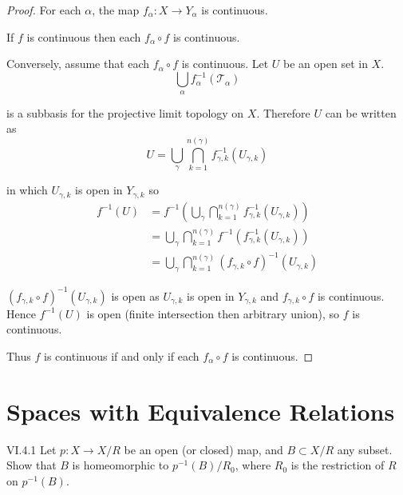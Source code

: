 \begin{proof}
	For each \( \alpha \), the map \( f_{\alpha}: X \to Y_{\alpha} \) is continuous.

	If \( f \) is continuous then each \( f_{\alpha} \circ f \) is continuous.

	Conversely, assume that each \( f_{\alpha} \circ f \) is continuous. Let \( U \) be an open set in \( X \).
	\[
		\bigcup_{\alpha} f_{\alpha}^{-1}(\mathscr{T}_{\alpha})
	\]

	is a subbasis for the projective limit topology on \( X \). Therefore \( U \) can be written as
	\[
		U = \bigcup_{\gamma} \bigcap^{n(\gamma)}_{k=1} f_{\gamma,k}^{-1}(U_{\gamma,k})
	\]

	in which \( U_{\gamma,k} \) is open in \( Y_{\gamma,k} \) so
	\begingroup
	\allowdisplaybreaks%
	\begin{align*}
		f^{-1}(U) & = f^{-1}\left( \bigcup_{\gamma} \bigcap^{n(\gamma)}_{k=1} f_{\gamma,k}^{-1}(U_{\gamma,k}) \right) \\
		          & = \bigcup_{\gamma} \bigcap^{n(\gamma)}_{k=1} f^{-1}(f_{\gamma,k}^{-1}(U_{\gamma,k}))              \\
		          & = \bigcup_{\gamma} \bigcap^{n(\gamma)}_{k=1} {(f_{\gamma,k} \circ f)}^{-1}(U_{\gamma,k})
	\end{align*}
	\endgroup

	\( {(f_{\gamma,k} \circ f)}^{-1}(U_{\gamma,k}) \) is open as \( U_{\gamma,k} \) is open in \( Y_{\gamma,k} \) and \( f_{\gamma,k} \circ f \) is continuous. Hence \( f^{-1}(U) \) is open (finite intersection then arbitrary union), so \( f \) is continuous.

	Thus \( f \) is continuous if and only if each \( f_{\alpha} \circ f \) is continuous.
\end{proof}

\section{Spaces with Equivalence Relations}

\begin{problem}{VI.4.1}
Let \( p: X \to X/R \) be an open (or closed) map, and \( B \subset X/R \) any subset. Show that \( B \) is homeomorphic to \( p^{-1}(B)/R_{0} \), where \( R_{0} \) is the restriction of \( R \) on \( p^{-1}(B) \).
\end{problem}

